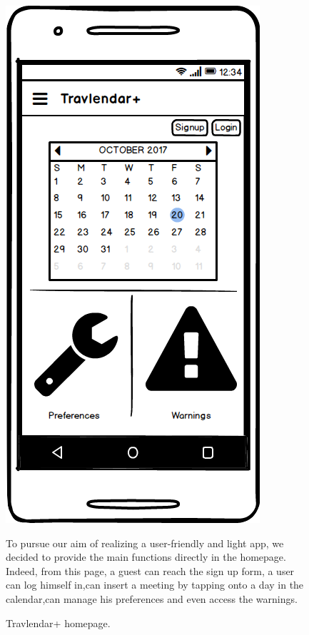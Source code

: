\documentclass[11pt]{article}
\begin{document}
	\begin{figure}
		\centering
		\includegraphics[width=0.7\linewidth]{Homepage.png}
		\caption{Travlendar+ homepage.  
		}
	\label{fig:homepage}
	\begin{center}
		To pursue our aim of realizing a user-friendly and light app, we decided to provide the main functions directly in the homepage. Indeed, from this page, a guest can reach the sign up form, a user can log himself in,can insert a meeting by tapping onto a day in the calendar,can manage his preferences and even access the warnings. \\ 
	\end{center}
	\end{figure}


				
				
\end{document}
